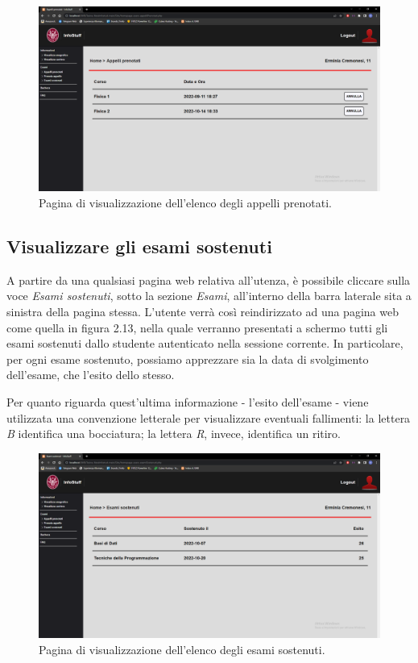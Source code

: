 \documentclass [a4paper,11pt]{book}
\begin{document}
\begin{figure}
\centering
\includegraphics[scale=0.3]{figura2-12.png}
\caption{Pagina di visualizzazione dell'elenco degli appelli prenotati.}
\end{figure}

\medskip

\subsection{Visualizzare gli esami sostenuti}

A partire da una qualsiasi pagina web relativa all'utenza, è possibile cliccare sulla voce \emph{Esami sostenuti}, sotto la sezione \emph{Esami}, all'interno della barra laterale sita a sinistra della pagina stessa. L'utente verrà così reindirizzato ad una pagina web come quella in figura 2.13, nella quale verranno presentati a schermo tutti gli esami sostenuti dallo studente autenticato nella sessione corrente. In particolare, per ogni esame sostenuto, possiamo apprezzare sia la data di svolgimento dell'esame, che l'esito dello stesso.

Per quanto riguarda quest'ultima informazione - l'esito dell'esame - viene utilizzata una convenzione letterale per visualizzare eventuali fallimenti: la lettera \emph{B} identifica una bocciatura; la lettera \emph{R}, invece, identifica un ritiro.

\begin{figure}
\centering
\includegraphics[scale=0.3]{figura2-13.png}
\caption{Pagina di visualizzazione dell'elenco degli esami sostenuti.}
\end{figure}
\end{document}
